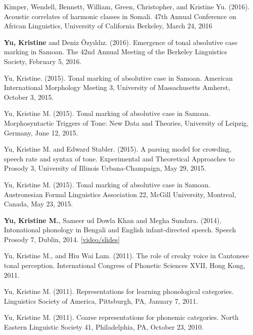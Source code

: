 \documentclass[10pt]{article}
\begin{document}
\begin{bibenum}
  \item Kimper, Wendell, Bennett, William, Green, Christopher, and Kristine Yu. (2016). Acoustic correlates of harmonic classes in
    Somali. 47th Annual Conference on African Linguistics, University
    of California Berkeley, March 24, 2016

  \item \textbf{Yu, Kristine} and Deniz \"{O}zy\i{}ld\i{}z. (2016). Emergence of tonal absolutive case
    marking in Samoan. The 42nd Annual Meeting of the Berkeley
    Linguistics Society, February 5, 2016.

  \item Yu, Kristine. (2015). Tonal marking of absolutive case in
    Samoan. American International Morphology Meeting 3, University of
    Massachusetts Amherst, October 3, 2015.

  \item Yu, Kristine M. (2015). Tonal marking of absolutive case in
    Samoan. Morphosyntactic Triggers of Tone:
New Data and Theories, University of Leipzig, Germany, June 12, 2015.

  \item Yu, Kristine M. and Edward Stabler. (2015). A parsing model for crowding, speech rate and syntax of tone. Experimental and Theoretical Approaches to Prosody 3,
    University of Illinois Urbana-Champaign, May 29, 2015.

  \item Yu, Kristine M. (2015). Tonal marking of absolutive case in
    Samoan. Austronesian Formal Linguistics Association 22, McGill
    University, Montreal, Canada, May 23, 2015.

\item \textbf{Yu, Kristine M.}, Sameer ud Dowla Khan and Megha
  Sundara. (2014). Intonational phonology in Bengali and English
  infant-directed speech. Speech Prosody 7, Dublin, 2014. [\href{https://www.superlectures.com/speechprosody2014/intonational-phonology-in-bengali-and-english-infant-directed-speech}{video/slides}]
  \item Yu, Kristine M., and Hiu Wai Lam. (2011). The role of creaky voice in Cantonese
    tonal perception. International Congress of Phonetic Sciences XVII, Hong Kong, 2011.

  \item Yu, Kristine M. (2011). Representations for learning
    phonological categories. Linguistics Society of America,
    Pittsburgh, PA, January 7, 2011.

  \item Yu, Kristine M. (2011). Coarse representations for phonemic
    categories. North Eastern Linguistic Society 41, Philadelphia, PA,
    October 23, 2010.


\end{bibenum}
\end{document}
